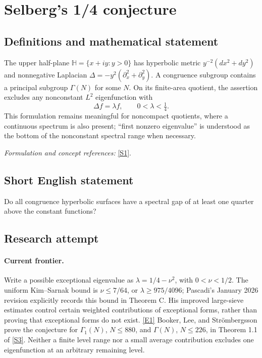 \documentclass[11pt]{article}
\newcommand{\sref}[2]{\hyperlink{source:#1:#2}{[S#2]}}
\newcommand{\eref}[2]{\hyperlink{extra:#1:#2}{[E#2]}}
\newif\ifshowcatalogue
\newcommand{\cataloguescope}[1]{\ifshowcatalogue
 \paragraph{Exact scope in the supplied catalogue.}
 \begin{quote}\small #1\end{quote}\fi}
\begin{document}
\setcounter{section}{0}
\clearpage
\section*{\texorpdfstring{Selberg's 1/4 conjecture}{Selberg's 1/4 conjecture}}\label{statement}
\subsection{Definitions and mathematical statement}
The upper half-plane $\mathbb H=\{x+iy:y>0\}$ has hyperbolic metric $y^{-2}(dx^2+dy^2)$ and nonnegative Laplacian $\Delta=-y^2(\partial_x^2+\partial_y^2)$. A congruence subgroup contains a principal subgroup $\Gamma(N)$ for some $N$. On its finite-area quotient, the assertion excludes any nonconstant $L^2$ eigenfunction with
\[
 \Delta f=\lambda f,\qquad0<\lambda<\tfrac14.
\]
This formulation remains meaningful for noncompact quotients, where a continuous spectrum is also present; ``first nonzero eigenvalue'' is understood as the bottom of the nonconstant spectral range when necessary.
\par\smallskip\textit{Formulation and concept references:} \sref{statement}{1}.
\cataloguescope{Prove that the first nonzero eigenvalue lambda\_1 of the Laplace-Beltrami operator on every congruence quotient of the upper half-plane is at least 1/4.}
\subsection{Short English statement}
Do all congruence hyperbolic surfaces have a spectral gap of at least one quarter above the constant functions?
\subsection{Research attempt}

\paragraph{Current frontier.}
Write a possible exceptional eigenvalue as $\lambda=1/4-\nu^2$, with
$0<\nu<1/2$. The uniform Kim--Sarnak bound is
$\nu\le 7/64$, or $\lambda\ge 975/4096$; Pascadi's January 2026 revision
explicitly records this bound in Theorem C. His improved large-sieve estimates
control certain weighted contributions of exceptional forms, rather than proving
that exceptional forms do not exist. \eref{statement}{1}
Booker, Lee, and Str\"ombergsson prove the conjecture for $\Gamma_1(N)$,
$N\le880$, and $\Gamma(N)$, $N\le226$, in Theorem 1.1 of
\sref{statement}{3}. Neither a finite level range nor a small average contribution
excludes one eigenfunction at an arbitrary remaining level.
\end{document}
